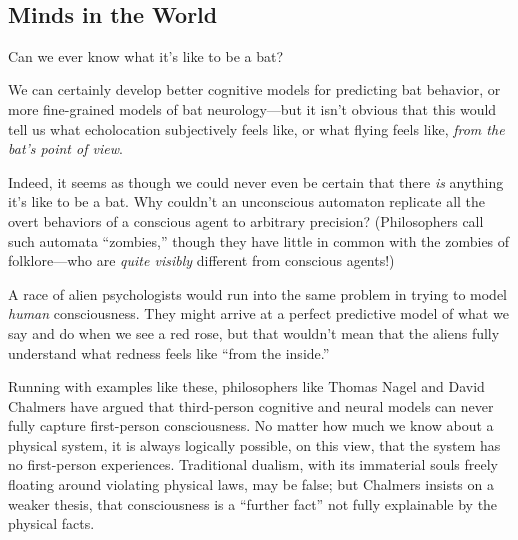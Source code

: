 {
 ~}

\subsection{Minds in the World}

{
 Can we ever know what it's like to be a bat?}

{
 We can certainly develop better cognitive models for predicting
bat behavior, or more fine-grained models of bat neurology---but it
isn't obvious that this would tell us what echolocation
subjectively feels like, or what flying feels like, \textit{from the
bat's point of view}.}

{
 Indeed, it seems as though we could never even be certain that
there \textit{is} anything it's like to be a bat. Why
couldn't an unconscious automaton replicate all the
overt behaviors of a conscious agent to arbitrary precision?
(Philosophers call such automata
``zombies,'' though they have little
in common with the zombies of folklore---who are \textit{quite visibly}
different from conscious agents!)}

{
 A race of alien psychologists would run into the same problem in
trying to model \textit{human} consciousness. They might arrive at a
perfect predictive model of what we say and do when we see a red rose,
but that wouldn't mean that the aliens fully understand
what redness feels like ``from the
inside.''}

{
 Running with examples like these, philosophers like Thomas Nagel
and David Chalmers have argued that third-person cognitive and neural
models can never fully capture first-person
consciousness. No matter how much we know about a
physical system, it is always logically possible, on this view, that
the system has no first-person experiences. Traditional dualism, with
its immaterial souls freely floating around violating physical laws,
may be false; but Chalmers insists on a weaker thesis, that
consciousness is a ``further fact''
not fully explainable by the physical facts.}


